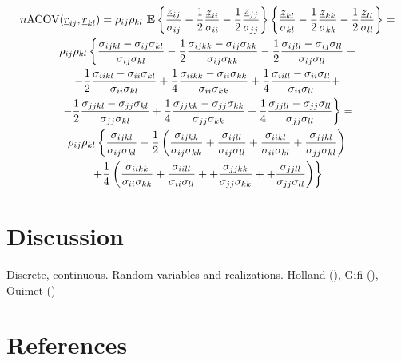 \documentclass[
  12pt,
  letterpaper,
  DIV=11,
  numbers=noendperiod]{scrartcl}
\newcommand{\sectionbreak}{\clearpage}
\newcommand{\ul}[1]{\underline{#1}}
\begin{document}
\begin{multline}
n\text{ACOV}(\ul{r}_{ij},\ul{r}_{kl})=\rho_{ij}\rho_{kl}\ \large{\mathbf{E}}\left\{\frac{\ul{z}_{ij}}{\sigma_{ij}}-\frac12\frac{\ul{z}_{ii}}{\sigma_{ii}}-\frac12\frac{\ul{z}_{jj}}{\sigma_{jj}}\right\}\left\{\frac{\ul{z}_{kl}}{\sigma_{kl}}-\frac12\frac{\ul{z}_{kk}}{\sigma_{kk}}-\frac12\frac{\ul{z}_{ll}}{\sigma_{ll}}\right\}=\\
\rho_{ij}\rho_{kl}\left\{\frac{\sigma_{ijkl}-\sigma_{ij}\sigma_{kl}}{\sigma_{ij}\sigma_{kl}}-\frac12\frac{\sigma_{ijkk}-\sigma_{ij}\sigma_{kk}}{\sigma_{ij}\sigma_{kk}}-\frac12\frac{\sigma_{ijll}-\sigma_{ij}\sigma_{ll}}{\sigma_{ij}\sigma_{ll}}\right.+\\
-\frac12\frac{\sigma_{iikl}-\sigma_{ii}\sigma_{kl}}{\sigma_{ii}\sigma_{kl}}+\frac14\frac{\sigma_{iikk}-\sigma_{ii}\sigma_{kk}}{\sigma_{ii}\sigma_{kk}}+\frac14\frac{\sigma_{iill}-\sigma_{ii}\sigma_{ll}}{\sigma_{ii}\sigma_{ll}}+\\
\left.-\frac12\frac{\sigma_{jjkl}-\sigma_{jj}\sigma_{kl}}{\sigma_{jj}\sigma_{kl}}+\frac14\frac{\sigma_{jjkk}-\sigma_{jj}\sigma_{kk}}{\sigma_{jj}\sigma_{kk}}+\frac14\frac{\sigma_{jjll}-\sigma_{jj}\sigma_{ll}}{\sigma_{jj}\sigma_{ll}}\right\}=\\
\rho_{ij}\rho_{kl}\left\{\frac{\sigma_{ijkl}}{\sigma_{ij}\sigma_{kl}}
-\frac12\left(\frac{\sigma_{ijkk}}{\sigma_{ij}\sigma_{kk}}
+\frac{\sigma_{ijll}}{\sigma_{ij}\sigma_{ll}}
+\frac{\sigma_{iikl}}{\sigma_{ii}\sigma_{kl}}
+\frac{\sigma_{jjkl}}{\sigma_{jj}\sigma_{kl}}\right)\right.\\
\left.+\frac14\left(\frac{\sigma_{iikk}}{\sigma_{ii}\sigma_{kk}}
+\frac{\sigma_{iill}}{\sigma_{ii}\sigma_{ll}}+
+\frac{\sigma_{jjkk}}{\sigma_{jj}\sigma_{kk}}+
+\frac{\sigma_{jjll}}{\sigma_{jj}\sigma_{ll}}\right)\right\}
\end{multline}

\section{Discussion}\label{discussion}

Discrete, continuous. Random variables and realizations. Holland
(), Gifi
(), Ouimet
()

\sectionbreak

\section*{References}\label{references}
\end{document}
